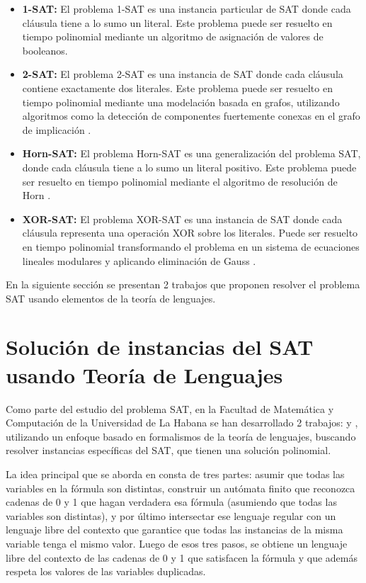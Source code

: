 \begin{itemize}
  \item \textbf{1-SAT:} El problema 1-SAT es una instancia particular de SAT donde cada cláusula tiene a lo sumo un literal.
        Este problema puede ser resuelto en tiempo polinomial mediante un algoritmo de asignación de valores de booleanos.
        
  \item \textbf{2-SAT:} El problema 2-SAT es una instancia de SAT donde cada cláusula contiene exactamente dos literales.  Este problema puede ser resuelto en tiempo polinomial mediante una modelación basada en grafos, utilizando algoritmos como la detección de componentes fuertemente conexas en el grafo de implicación \cite{2satbib}.
        
  \item \textbf{Horn-SAT:} El problema Horn-SAT es una generalización del problema SAT, donde cada cláusula tiene a lo sumo un literal positivo.  Este problema puede ser resuelto en tiempo polinomial mediante el algoritmo de resolución de Horn \cite{hornsatbib}.
        
  \item \textbf{XOR-SAT:} El problema XOR-SAT es una instancia de SAT donde cada cláusula representa una operación XOR sobre los literales. Puede ser resuelto en tiempo polinomial transformando el problema en un sistema de ecuaciones lineales modulares y aplicando eliminación de Gauss \cite{xorsatbib}.
\end{itemize}

En la siguiente sección se presentan 2 trabajos que proponen resolver el problema SAT usando elementos de la teoría de lenguajes.

\section{Solución de instancias del SAT usando Teoría de Lenguajes}

Como parte del estudio del problema SAT, en la Facultad de Matemática y Computación de la Universidad de La Habana
se han desarrollado 2 trabajos: \cite{aCFSAT} y \cite{aSRCSAT}, utilizando un enfoque basado en formalismos de la teoría de lenguajes, buscando resolver 
instancias específicas del SAT, que tienen una solución polinomial.

La idea principal que se aborda en \cite{aCFSAT} consta de tres partes: asumir que todas las variables en 
la fórmula son distintas, construir un autómata finito que reconozca cadenas de 0 y 1 que hagan verdadera 
esa fórmula (asumiendo que todas las variables son distintas), y por último intersectar ese lenguaje 
regular con un lenguaje libre del contexto que garantice que todas las instancias de la misma variable 
tenga el mismo valor. Luego de esos tres pasos, se obtiene un lenguaje libre del contexto de las 
cadenas de 0 y 1 que satisfacen la fórmula y que además respeta los valores de las variables duplicadas. 

